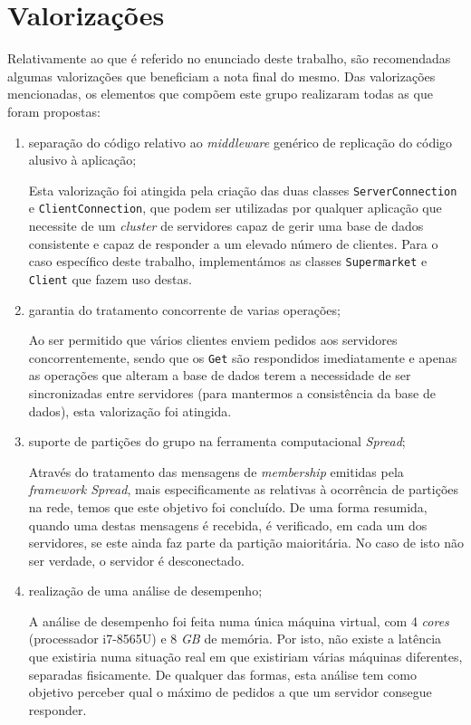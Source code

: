 \documentclass[a4paper]{report}
\begin{document}
\chapter{Valorizações} \label{ch:ProblemDescription}
\large{
	Relativamente ao que é referido no enunciado deste trabalho, são recomendadas algumas valorizações que beneficiam a nota final do mesmo.
	Das valorizações mencionadas, os elementos que compõem este grupo realizaram todas as que foram propostas:
	\begin{enumerate}
		\item separação do código relativo ao \textit{middleware} genérico de replicação do código alusivo à aplicação;
		
		Esta valorização foi atingida pela criação das duas classes \texttt{ServerConnection} e \texttt{ClientConnection}, que podem ser utilizadas por qualquer aplicação que necessite de um \textit{cluster} de servidores capaz de gerir uma base de dados consistente e capaz de responder a um elevado número de clientes. Para o caso específico deste trabalho, implementámos as classes \texttt{Supermarket} e \texttt{Client} que fazem uso destas.
		
		\item garantia do tratamento concorrente de varias operações;
		
		Ao ser permitido que vários clientes enviem pedidos aos servidores concorrentemente, sendo que os \texttt{Get} são respondidos imediatamente e apenas as operações que alteram a base de dados terem a necessidade de ser sincronizadas entre servidores (para mantermos a consistência da base de dados), esta valorização foi atingida.
		
		\item suporte de partições do grupo na ferramenta computacional \textit{Spread};
		
		Através do tratamento das mensagens de \textit{membership} emitidas pela \textit{framework Spread}, mais especificamente as relativas à ocorrência de partições na rede, temos que este objetivo foi concluído. De uma forma resumida, quando uma destas mensagens é recebida, é verificado, em cada um dos servidores, se este ainda faz parte da partição maioritária. No caso de isto não ser verdade, o servidor é desconectado.
		
		\item realização de uma análise de desempenho;
		
		A análise de desempenho foi feita numa única máquina virtual, com 4 \textit{cores} (processador i7-8565U) e 8 \textit{GB} de memória.
		Por isto, não existe a latência que existiria numa situação real em que existiriam várias máquinas diferentes, separadas fisicamente.
		De qualquer das formas, esta análise tem como objetivo perceber qual o máximo de pedidos a que um servidor consegue responder.


\end{enumerate}}
\end{document}
